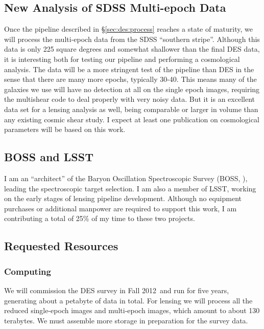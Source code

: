 \documentclass[12pt]{article}
\newcommand{\commissdate}{Fall 2012}
\begin{document}
\subsection{New Analysis of SDSS Multi-epoch Data} \label{sec:sdssnew}

Once the pipeline described in \S \ref{sec:des:process} reaches a state of
maturity, we will process the multi-epoch data from the SDSS ``southern
stripe''.  Although this data is only 225 square degrees and somewhat shallower
than the final DES data, it is interesting both for testing our pipeline and
performing a cosmological analysis.  The data will be a more stringent test of
the pipeline than DES in the sense that there are many more epochs, typically
30-40.  This means many of the galaxies we use will have no detection at all on
the single epoch images, requiring the multishear code to deal properly with
very noisy data.  But it is an excellent data set for a lensing analysis as
well, being comparable or larger in volume than any existing cosmic shear
study.  I expect at least one publication on cosmological parameters will be
based on this work.

\subsection{BOSS and LSST}

I am an ``architect'' of the Baryon Oscillation Spectroscopic Survey (BOSS,
\cite{BossWhitePaper}), leading the spectroscopic target selection.  I am also
a member of LSST, working on the early stages of lensing pipeline development.
Although no equipment purchases or additional manpower are required to support
this work, I am contributing a total of 25\% of my time to these two projects.

\subsection{Requested Resources}

\subsubsection{Computing}

We will commission the DES survey in \commissdate\ and run for five years,
generating about a petabyte of data in total.  For lensing we will process all
the reduced single-epoch images and multi-epoch images, which amount to about
130 terabytes.  We must assemble more storage in preparation for the survey
data.
\end{document}
